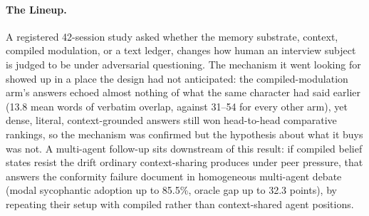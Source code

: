 \paragraph{The Lineup.} A registered 42-session study asked whether the memory
substrate, context, compiled modulation, or a text ledger, changes how human an
interview subject is judged to be under adversarial questioning.
The mechanism it went looking for showed up in a place the design had not anticipated:
the compiled-modulation arm's answers echoed almost nothing of what the same character
had said earlier (13.8 mean words of verbatim overlap, against 31--54 for every other
arm), yet dense, literal, context-grounded answers still won head-to-head comparative
rankings, so the mechanism was confirmed but the hypothesis about what it buys was not.
A multi-agent follow-up sits downstream of this result: if compiled belief states
resist the drift ordinary context-sharing produces under peer pressure, that answers
the conformity failure \citet{bertalanic2026costofconsensus} document in homogeneous
multi-agent debate (modal sycophantic adoption up to 85.5\%, oracle gap up to 32.3
points), by repeating their setup with compiled rather than context-shared agent
positions.
\fi
